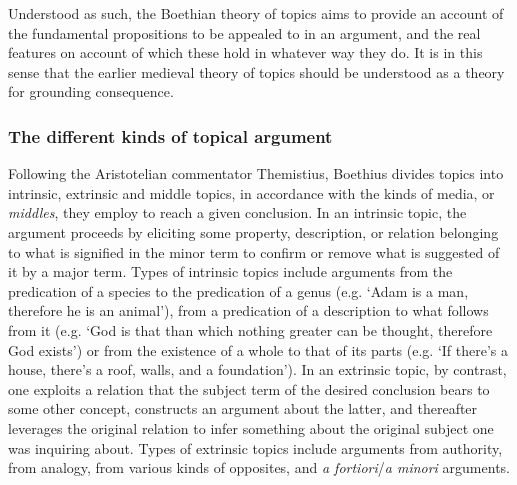 \documentclass[a4paper, 11pt]{article}
\begin{document}
Understood as such, the Boethian theory of topics aims to provide an account of the fundamental propositions to be appealed to in an argument, and the real features on account of which these hold in whatever way they do. It is in this sense that the earlier medieval theory of topics should be understood as a theory for grounding consequence.

\subsubsection{The different kinds of topical argument}
Following the Aristotelian commentator Themistius, Boethius divides topics into intrinsic, extrinsic and middle topics, in accordance with the kinds of media, or \emph{middles}, they employ to reach a given conclusion. In an intrinsic topic, the argument proceeds by eliciting some property, description, or relation belonging to what is signified in the minor term to confirm or remove what is suggested of it by a major term. Types of intrinsic topics include arguments from the predication of a species to the predication of a genus (e.g. `Adam is a man, therefore he is an animal'), from a predication of a description to what follows from it (e.g. `God is that than which nothing greater can be thought, therefore God exists') or from the existence of a whole to that of its parts (e.g. `If there's a house, there's a roof, walls, and a foundation'). In an extrinsic topic, by contrast, one exploits a relation that the subject term of the desired conclusion bears to some other concept, constructs an argument about the latter, and thereafter leverages the original relation to infer something about the original subject one was inquiring about. Types of extrinsic topics include arguments from authority, from analogy, from various kinds of opposites, and \emph{a fortiori}/\emph{a minori} arguments.
\end{document}
